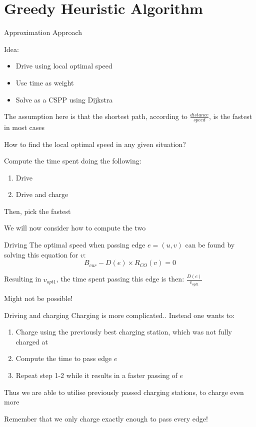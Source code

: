 \section{Greedy Heuristic Algorithm}

\begin{frame}{Approximation Approach}

  Idea:
  \begin{itemize}
    \item Drive using local optimal speed
    \item Use time as weight
    \item Solve as a CSPP using Dijkstra
  \end{itemize}
  The assumption here is that the shortest path, according to $\frac{distance}{speed}$, is the fastest in most cases
\end{frame}

\begin{frame}
  How to find the local optimal speed in any given situation?

  Compute the time spent doing the following:
  \begin{enumerate}
    \item Drive
    \item Drive and charge
  \end{enumerate}
  Then, pick the fastest

  We will now consider how to compute the two

\end{frame}

\begin{frame}{Driving}
  The optimal speed when passing edge $e=(u,v)$ can be found by solving this equation for $v$:
  \[B_{cur} - D(e) \times R_{CO}(v)=0\]

  Resulting in $v_{opt1}$, the time spent passing this edge is then: $\frac{D(e)}{v_{opt1}}$

  Might not be possible!
\end{frame}
\begin{frame}{Driving and charging}
Charging is more complicated.. Instead one wants to:

\begin{enumerate}
    \item Charge using the previously best charging station, which was not fully charged at
    \item Compute the time to pass edge $e$
    \item Repeat step 1-2 while it results in a faster passing of $e$
  \end{enumerate}

  Thus we are able to utilise previously passed charging stations, to charge even more

  Remember that we only charge exactly enough to pass every edge!
\end{frame}

